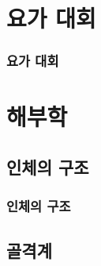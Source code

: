 \documentclass[12pt, a4paper, oneside]{book}
\let\stdsection\section
\renewcommand\section{\newpage\stdsection}
\begin{document}
	\part{요가 대회}
	\noptcrule
	\parttoc				

	\section{요가 대회}










	\part{해부학}
	\noptcrule
	\parttoc				



	\chapter{인체의 구조}
	\minitoc%

	\section{인체의 구조}


	\chapter{골격계}
	\minitoc%

	\newpage
\end{document}
